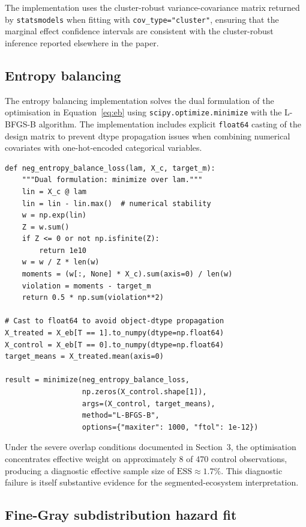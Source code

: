\documentclass[11pt,a4paper]{article}
\begin{document}
The implementation uses the cluster-robust variance-covariance matrix returned by \texttt{statsmodels} when fitting with \texttt{cov\_type="cluster"}, ensuring that the marginal effect confidence intervals are consistent with the cluster-robust inference reported elsewhere in the paper.

\subsection{Entropy balancing}

The entropy balancing implementation solves the dual formulation of the optimisation in Equation~\ref{eq:eb} using \texttt{scipy.optimize.minimize} with the L-BFGS-B algorithm. The implementation includes explicit \texttt{float64} casting of the design matrix to prevent dtype propagation issues when combining numerical covariates with one-hot-encoded categorical variables.

\begin{lstlisting}[style=python, caption={Entropy balancing dual optimisation.}, label={lst:eb}]
def neg_entropy_balance_loss(lam, X_c, target_m):
    """Dual formulation: minimize over lam."""
    lin = X_c @ lam
    lin = lin - lin.max()  # numerical stability
    w = np.exp(lin)
    Z = w.sum()
    if Z <= 0 or not np.isfinite(Z):
        return 1e10
    w = w / Z * len(w)
    moments = (w[:, None] * X_c).sum(axis=0) / len(w)
    violation = moments - target_m
    return 0.5 * np.sum(violation**2)

# Cast to float64 to avoid object-dtype propagation
X_treated = X_eb[T == 1].to_numpy(dtype=np.float64)
X_control = X_eb[T == 0].to_numpy(dtype=np.float64)
target_means = X_treated.mean(axis=0)

result = minimize(neg_entropy_balance_loss,
                  np.zeros(X_control.shape[1]),
                  args=(X_control, target_means),
                  method="L-BFGS-B",
                  options={"maxiter": 1000, "ftol": 1e-12})
\end{lstlisting}

Under the severe overlap conditions documented in Section~3, the optimisation concentrates effective weight on approximately 8 of 470 control observations, producing a diagnostic effective sample size of $\mathrm{ESS} \approx 1.7\%$. This diagnostic failure is itself substantive evidence for the segmented-ecosystem interpretation.

\subsection{Fine-Gray subdistribution hazard fit}
\end{document}
